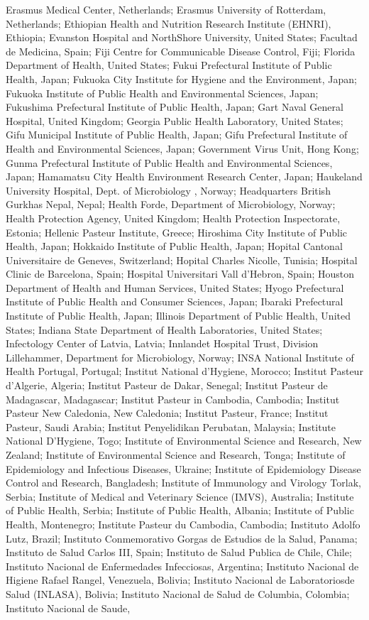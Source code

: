 Erasmus Medical Center, Netherlands; Erasmus University of Rotterdam, Netherlands; Ethiopian Health and Nutrition Research Institute (EHNRI), Ethiopia; Evanston Hospital and NorthShore University, United States; Facultad de Medicina, Spain; Fiji Centre for Communicable Disease Control, Fiji; Florida Department of Health, United States; Fukui Prefectural Institute of Public Health, Japan; Fukuoka City Institute for Hygiene and the Environment, Japan; Fukuoka Institute of Public Health and Environmental Sciences, Japan; Fukushima Prefectural Institute of Public Health, Japan; Gart Naval General Hospital, United Kingdom; Georgia Public Health Laboratory, United States; Gifu Municipal Institute of Public Health, Japan; Gifu Prefectural Institute of Health and Environmental Sciences, Japan; Government Virus Unit, Hong Kong; Gunma Prefectural Institute of Public Health and Environmental Sciences, Japan; Hamamatsu City Health Environment Research Center, Japan; Haukeland University Hospital, Dept. of Microbiology , Norway; Headquarters British Gurkhas Nepal, Nepal; Health Forde, Department of Microbiology, Norway; Health Protection Agency, United Kingdom; Health Protection Inspectorate, Estonia; Hellenic Pasteur Institute, Greece; Hiroshima City Institute of Public Health, Japan; Hokkaido Institute of Public Health, Japan; Hopital Cantonal Universitaire de Geneves, Switzerland; Hopital Charles Nicolle, Tunisia; Hospital Clinic de Barcelona, Spain; Hospital Universitari Vall d'Hebron, Spain; Houston Department of Health and Human Services, United States; Hyogo Prefectural Institute of Public Health and Consumer Sciences, Japan; Ibaraki Prefectural Institute of Public Health, Japan; Illinois Department of Public Health, United States; Indiana State Department of Health Laboratories, United States; Infectology Center of Latvia, Latvia; Innlandet Hospital Trust, Division Lillehammer, Department for Microbiology, Norway; INSA National Institute of Health Portugal, Portugal; Institut National d'Hygiene, Morocco; Institut Pasteur d'Algerie, Algeria; Institut Pasteur de Dakar, Senegal; Institut Pasteur de Madagascar, Madagascar; Institut Pasteur in Cambodia, Cambodia; Institut Pasteur New Caledonia, New Caledonia; Institut Pasteur, France; Institut Pasteur, Saudi Arabia; Institut Penyelidikan Perubatan, Malaysia; Institute National D'Hygiene, Togo; Institute of Environmental Science and Research, New Zealand; Institute of Environmental Science and Research, Tonga; Institute of Epidemiology and Infectious Diseases, Ukraine; Institute of Epidemiology Disease Control and Research, Bangladesh; Institute of Immunology and Virology Torlak, Serbia; Institute of Medical and Veterinary Science (IMVS), Australia; Institute of Public Health, Serbia; Institute of Public Health, Albania; Institute of Public Health, Montenegro; Institute Pasteur du Cambodia, Cambodia; Instituto Adolfo Lutz, Brazil; Instituto Conmemorativo Gorgas de Estudios de la Salud, Panama; Instituto de Salud Carlos III, Spain; Instituto de Salud Publica de Chile, Chile; Instituto Nacional de Enfermedades Infecciosas, Argentina; Instituto Nacional de Higiene Rafael Rangel, Venezuela, Bolivia; Instituto Nacional de Laboratoriosde Salud (INLASA), Bolivia; Instituto Nacional de Salud de Columbia, Colombia; Instituto Nacional de Saude, 